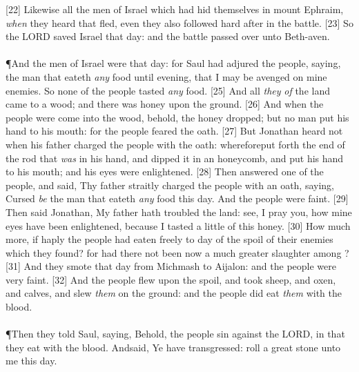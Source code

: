 [22] \textcolor[cmyk]{0.99998,1,0,0}{Likewise all the men of Israel which had hid themselves in mount Ephraim, \emph{when} they heard that   fled, even they also followed hard after  in the battle.}
[23] \textcolor[cmyk]{0.99998,1,0,0}{So the LORD saved Israel that day: and the battle passed over unto Beth-aven.}\\
\\
\P \textcolor[cmyk]{0.99998,1,0,0}{And the men of Israel were  that day: for Saul had adjured the people, saying,  the man that eateth \emph{any} food until evening, that I may be avenged on mine enemies. So none of the people tasted \emph{any} food.}
[25] \textcolor[cmyk]{0.99998,1,0,0}{And all \emph{they} \emph{of} the land came to a wood; and there was honey upon the ground.}
[26] \textcolor[cmyk]{0.99998,1,0,0}{And when the people were come into the wood, behold, the honey dropped; but no man put his hand to his mouth: for the people feared the oath.}
[27] \textcolor[cmyk]{0.99998,1,0,0}{But Jonathan heard not when his father charged the people with the oath: whereforeput forth the end of the rod that \emph{was} in his hand, and dipped it in an honeycomb, and put his hand to his mouth; and his eyes were enlightened.}
[28] \textcolor[cmyk]{0.99998,1,0,0}{Then answered one of the people, and said, Thy father straitly charged the people with an oath, saying, Cursed \emph{be} the man that eateth \emph{any} food this day. And the people were faint.}
[29] \textcolor[cmyk]{0.99998,1,0,0}{Then said Jonathan, My father hath troubled the land: see, I pray you, how mine eyes have been enlightened, because I tasted a little of this honey.}
[30] \textcolor[cmyk]{0.99998,1,0,0}{How much more, if haply the people had eaten freely to day of the spoil of their enemies which they found? for had there not been now a much greater slaughter among  ?}
[31] \textcolor[cmyk]{0.99998,1,0,0}{And they smote   that day from Michmash to Aijalon: and the people were very faint.}
[32] \textcolor[cmyk]{0.99998,1,0,0}{And the people flew upon the spoil, and took sheep, and oxen, and calves, and slew \emph{them} on the ground: and the people did eat \emph{them} with the blood.}\\
\\
\P \textcolor[cmyk]{0.99998,1,0,0}{Then they told Saul, saying, Behold, the people sin against the LORD, in that they eat with the blood. Andsaid, Ye have transgressed: roll a great stone unto me this day.}
